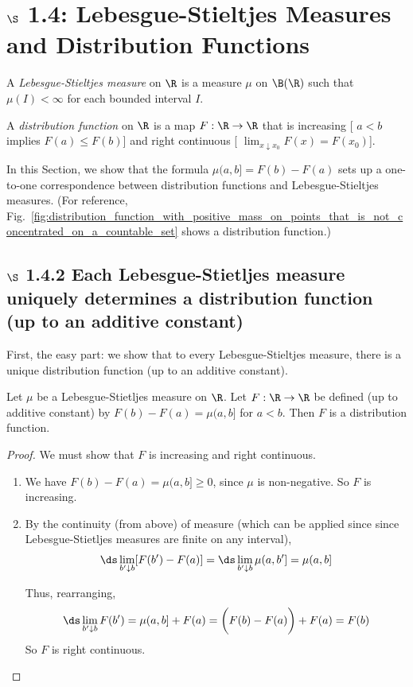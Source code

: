 \documentclass{article} %
\newif\ifActive
\begin{document}
 \section{$\S$ 1.4: Lebesgue-Stieltjes Measures and Distribution Functions} \label{sec:ls_measures_and_distribution_functions}
 
 \begin{definition}
 A \textit{Lebesgue-Stieltjes measure} on $\R$ is a measure $\mu$ on $\B(\R)$ such that $\mu(I) < \infty$ for each bounded interval $I$.	
 \end{definition}

\begin{definition}
 A \textit{distribution function} on $\R$ is a map $F : \R \to \R$ that is increasing [ $a<b$ implies $F(a) \leq F(b)$] and right continuous [ $\lim_{x \downarrow x_0} F(x) = F(x_0)$]. 
 \end{definition}
 

In this Section, we show that the formula $\mu(a,b] = F(b) - F(a)$ sets up a one-to-one correspondence between distribution functions and Lebesgue-Stieltjes measures.  {\tiny (For reference, Fig.~\ref{fig:distribution_function_with_positive_mass_on_points_that_is_not_concentrated_on_a_countable_set} shows a distribution function.)}
 
 \subsection{$\S$ 1.4.2 Each Lebesgue-Stietljes measure uniquely determines a distribution function (up to an additive constant)}
 First, the easy part: we show that to every Lebesgue-Stieltjes  measure, there is a unique distribution function (up to an additive constant). 
 
 \begin{theorem}
 Let $\mu$ be a Lebesgue-Stietljes measure on $\R$.  Let $F : \R \to \R$ be defined (up to additive constant) by $F(b)-F(a) = \mu(a,b]$ for $a<b$. Then $F$ is a distribution function.
\label{thm:from_ls_measure_to_distribution_function}
 \end{theorem}

\begin{proof}
We must show that $F$ is increasing and right continuous.

\ifActive 
\textbf{Workshop Exercise}: Finish the proof.
\else 
\begin{enumerate}
\item We have $F(b) - F(a) = \mu(a,b] \geq 0$, since $\mu$ is non-negative. So $F$ is increasing.  
\item By the continuity (from above) of measure (which can be applied since since Lebesgue-Stietljes measures are finite on any interval), 
\[ \ds\lim_{b' \downarrow b}[F(b') - F(a)] = \ds\lim_{b' \downarrow b} \mu(a,b'] = \mu(a,b]\]

Thus, rearranging,
\[ \ds\lim_{b' \downarrow b} F(b') = \mu(a,b] + F(a) = \bigg(F(b)-F(a)\bigg) + F(a) = F(b)\]
So $F$ is right continuous.  
\end{enumerate}
\fi 
\end{proof}
\end{document}
